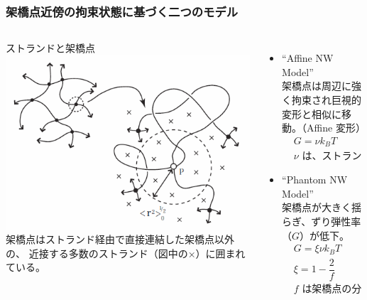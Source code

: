 \documentclass[12pt, dvipdfmx]{beamer}
\begin{document}
\begin{frame}
	\frametitle{架橋点近傍の拘束状態に基づく二つのモデル}
		\begin{columns}[totalwidth=1\textwidth]
				\begin{block}{ストランドと架橋点}
					\includegraphics[width=\textwidth]{JP_vicinity.png}
					架橋点はストランド経由で直接連結した架橋点以外の、
					\alert{近接する多数のストランド（図中の×）に囲まれている。}
				\end{block}
			\begin{itemize}
				\item ``Affine NW Model''\\
					架橋点は周辺に強く拘束され巨視的変形と相似に移動。（Affine 変形）
					\footnotesize
					\begin{align*}
						&G=\nu k_B T \\
						&\text{$\nu$ は、ストランドの数密度}
					\end{align*}
					\normalsize
				\item ``Phantom NW Model''\\
					架橋点が大きく揺らぎ、ずり弾性率（$G$）が低下。
					\footnotesize
					\begin{align*}
						&G=\xi \nu k_B T \\
						&\xi= 1 -\dfrac{2}{f}\\
						&\text{$f$ は架橋点の分岐数}
					\end{align*}
			\end{itemize}
		\end{columns}
\end{frame}
\end{document}
